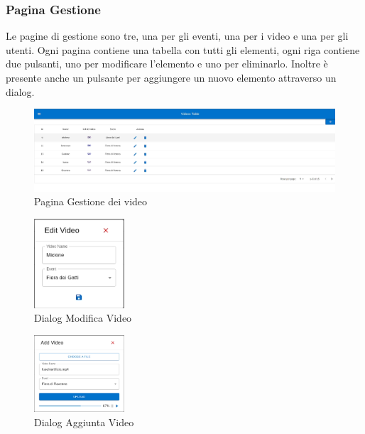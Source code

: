 \subsubsection{Pagina Gestione}
Le pagine di gestione sono tre, una per gli eventi, una per i video e una per gli utenti. Ogni pagina contiene una tabella con tutti gli elementi, ogni riga contiene due pulsanti, uno per modificare l'elemento e uno per eliminarlo. Inoltre è presente anche un pulsante per aggiungere un nuovo elemento attraverso un dialog.\\
\begin{figure}[H]
    \centering
    \includegraphics[width=1\textwidth]{images/interface/videotable.png}
    \caption{Pagina Gestione dei video}
    \label{fig:gestionevideo}
\end{figure}
\begin{figure}[H]
    \centering
    \includegraphics[width=0.3\textwidth]{images/interface/editvideo.png}
    \caption{Dialog Modifica Video}
    \label{fig:modifica video}
\end{figure}
\begin{figure}[H]
    \centering
    \includegraphics[width=0.3\textwidth]{images/interface/addvideo.png}
    \caption{Dialog Aggiunta Video}
    \label{fig:aggiuntavideo}
\end{figure}
